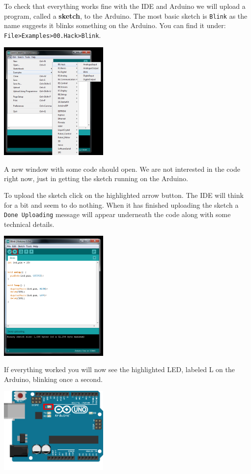 To check that everything works fine with the IDE and Arduino we will upload a program,
called a \textbf{sketch},
to the Arduino.
The most basic sketch is \lstinline|Blink|
as the name suggests it blinks something on the Arduino.
You can find it under: 
\lstinline|File>Examples>00.Hack>Blink|.

\begin{center}
    \includegraphics[width=0.4\textwidth]{./Graphics/ide_blink}
\end{center}

A new window with some code should open.  
We are not interested in the code right now,
just in getting the sketch running on the Arduino.

To upload the sketch click on the highlighted arrow button. 
The IDE will think for a bit and seem to do nothing.
When it has finished uploading the sketch a \lstinline|Done Uploading|
message will appear underneath the code
along with some technical details.

\begin{center}
    \includegraphics[width=0.4\textwidth]{./Graphics/ide_upload}
\end{center}

If everything worked you will now see the highlighted LED,
labeled L on the Arduino,
blinking once a second.


\begin{center}
    \includegraphics[width=0.4\textwidth]{./Graphics/arduino}
\end{center}

